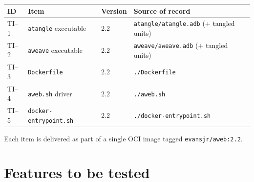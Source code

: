 \documentclass[11pt]{article}
\begin{document}
\begin{center}
\begin{tabular}{@{}llll@{}}
\toprule
ID    & Item                          & Version & Source of record\\
\midrule
TI--1 & \texttt{atangle} executable   & 2.2 & \texttt{atangle/atangle.adb} (+ tangled units)\\
TI--2 & \texttt{aweave}  executable   & 2.2 & \texttt{aweave/aweave.adb}  (+ tangled units)\\
TI--3 & \texttt{Dockerfile}           & 2.2 & \texttt{./Dockerfile}\\
TI--4 & \texttt{aweb.sh} driver     & 2.2 & \texttt{./aweb.sh}\\
TI--5 & \texttt{docker-entrypoint.sh} & 2.2 & \texttt{./docker-entrypoint.sh}\\
\bottomrule
\end{tabular}
\end{center}
Each item is delivered as part of a single OCI image tagged
\texttt{evansjr/aweb:2.2}.

\section{Features to be tested}
\end{document}
